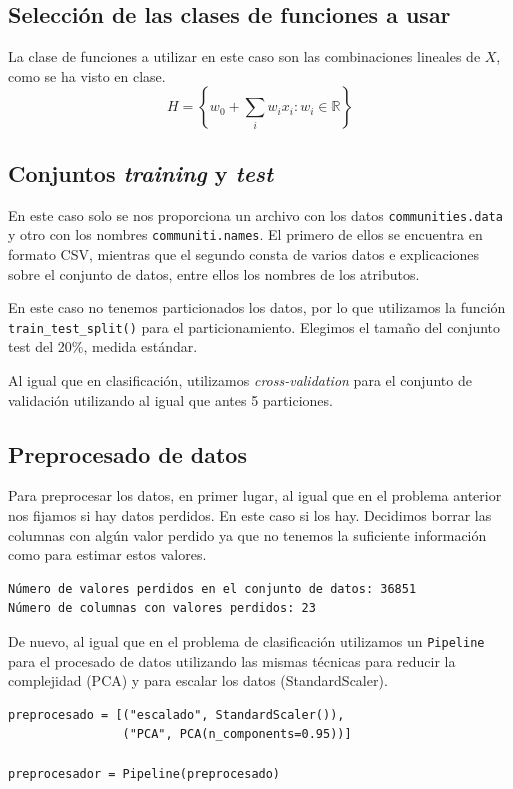 \documentclass[size=a4, parskip=half, titlepage=false, toc=flat, toc=bib, 12pt]{scrartcl}
\begin{document}
\subsection{Selección de las clases de funciones a usar}

La clase de funciones a utilizar en este caso son las combinaciones lineales de $X$, como se ha visto en clase.
$$H = \left\{ w_0 + \sum_i w_i x_i : w_i \in \mathbb{R} \right\} $$

\subsection{Conjuntos \textit{training} y \textit{test}}
En este caso solo se nos proporciona un archivo con los datos \verb|communities.data| y otro con los nombres \verb|communiti.names|. El primero de ellos se encuentra en formato CSV, mientras que el segundo consta de varios datos e explicaciones sobre el conjunto de datos, entre ellos los nombres de los atributos.

 En este caso no tenemos particionados los datos, por lo que utilizamos la función \verb|train_test_split()| para el particionamiento.  Elegimos el tamaño del conjunto test del 20\%, medida estándar.

 Al igual que en clasificación, utilizamos \textit{cross-validation} para el conjunto de validación utilizando al igual que antes 5 particiones.
\subsection{Preprocesado de datos}
Para preprocesar los datos, en primer lugar, al igual que en el problema anterior nos fijamos si hay datos perdidos. En este caso si los hay. Decidimos borrar las columnas con algún valor perdido ya que no tenemos la suficiente información como para estimar estos valores.
\begin{verbatim}
Número de valores perdidos en el conjunto de datos: 36851
Número de columnas con valores perdidos: 23
\end{verbatim}

De nuevo, al igual que en el problema de clasificación utilizamos un \verb|Pipeline| para el procesado de datos utilizando las mismas técnicas para reducir la complejidad (PCA) y para escalar los datos (StandardScaler).

\begin{verbatim}
preprocesado = [("escalado", StandardScaler()),
                ("PCA", PCA(n_components=0.95))]

preprocesador = Pipeline(preprocesado)
\end{verbatim}
\end{document}

